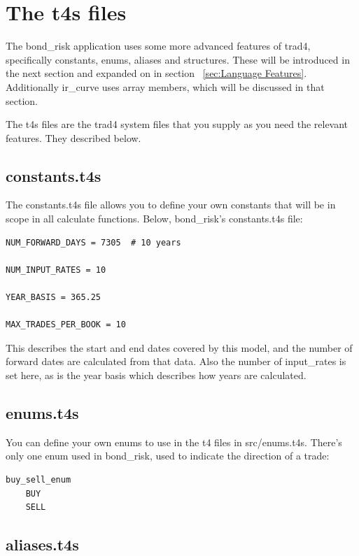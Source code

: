 \documentclass{report}
\begin{document}
\section{The t4s files}

The bond_risk application uses some more advanced features of trad4, specifically constants, enums, aliases and structures. These will be introduced in the next section and expanded on in section ~\ref{sec:Language Features}. Additionally ir_curve uses array members, which will be discussed in that section.

The t4s files are the trad4 system files that you supply as you need the relevant features. They described below.

\subsection{constants.t4s}

The constants.t4s file allows you to define your own constants that will be in scope in all calculate functions. Below, bond_risk's constants.t4s file:


\begin{verbatim}
NUM_FORWARD_DAYS = 7305  # 10 years

NUM_INPUT_RATES = 10

YEAR_BASIS = 365.25

MAX_TRADES_PER_BOOK = 10
\end{verbatim}

This describes the start and end dates covered by this model, and the number of forward dates are calculated from that data. Also the number of input_rates is set here, as is the year basis which describes how years are calculated.

\subsection{enums.t4s}

You can define your own enums to use in the t4 files in src/enums.t4s. There's only one enum used in bond_risk, used to indicate the direction of a trade:

\begin{verbatim}
buy_sell_enum
    BUY
    SELL
\end{verbatim}


\subsection{aliases.t4s}
\end{document}
